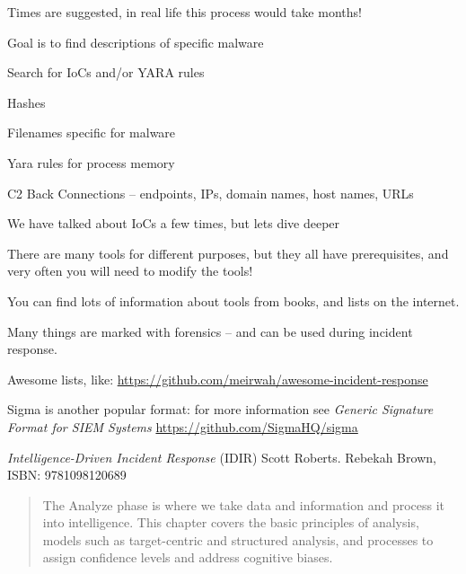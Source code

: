 \documentclass[Screen16to9,17pt]{foils}
\begin{document}
Times are suggested, in real life this process would take months!



Goal is to find descriptions of specific malware
\begin{quote}

\end{quote}

Search for IoCs and/or YARA rules
\begin{list2}
\item Hashes
\item Filenames specific for malware
\item Yara rules for process memory
\item C2 Back Connections -- endpoints, IPs, domain names, host names, URLs
\end{list2}




We have talked about IoCs a few times, but lets dive deeper

There are many tools for different purposes, but they all have prerequisites, and very often you will need to modify the tools!

You can find lots of information about tools from books, and lists on the internet.

Many things are marked with forensics -- and can be used during incident response.

\begin{list2}
    \item Awesome lists, like: \url{https://github.com/meirwah/awesome-incident-response}
    \item Sigma is another popular format: for more information see \emph{Generic Signature Format for SIEM Systems}
    \url{https://github.com/SigmaHQ/sigma}
\end{list2}







\emph{Intelligence-Driven Incident Response} (IDIR)
 Scott Roberts. Rebekah Brown, ISBN: 9781098120689

\begin{quote}
The Analyze phase is where we take data and information and process it into intelligence. This chapter covers the basic principles of analysis, models such as target-centric and structured analysis, and processes to assign confidence levels and address cognitive biases.
\end{quote}
\end{document}
